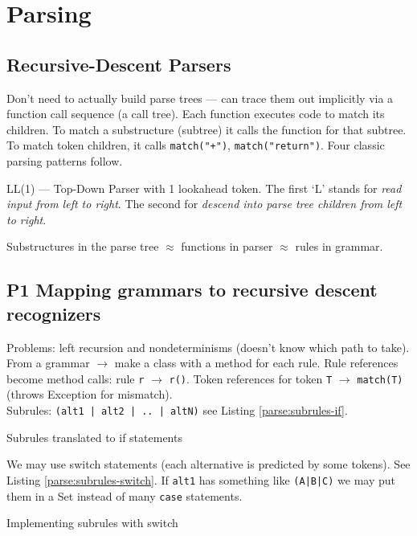 \section{Parsing}


\subsection{Recursive-Descent Parsers}

Don't need to actually build parse trees ---
can trace them out implicitly via a function call sequence (a call tree).
Each function executes code to match its children.
To match a substructure (subtree) it calls the function for that subtree.
To match token children, it calls \verb=match("+")=, \verb=match("return")=.
Four classic parsing patterns follow.

LL(1) --- Top-Down Parser with 1 lookahead token.
The first `L' stands for \emph{read input from left to right}.
The second for \emph{descend into parse tree children from left to right}.

Substructures in the parse tree $\approx$ functions in parser
$\approx$ rules in grammar.


\subsection{P1 Mapping grammars to recursive descent recognizers}

Problems: left recursion and nondeterminisms (doesn't know which path to take).
From a grammar $\rightarrow$ make a class with a method for each rule.
Rule references become method calls: rule \verb=r= $\rightarrow$ \verb=r()=.
Token references for token \verb=T= $\rightarrow$ \verb=match(T)=
(throws Exception for mismatch).\\
Subrules: \verb=(alt1 | alt2 | .. | altN)= see Listing \ref{parse:subrules-if}.

\begin{program}
\caption{Subrules translated to if statements\label{parse:subrules-if}}
\end{program}

We may use switch statements (each alternative is predicted by some tokens).
See Listing \ref{parse:subrules-switch}.
If \verb=alt1= has something like \verb=(A|B|C)=
we may put them in a Set instead of many \verb=case= statements.

\begin{program}
\caption{Implementing subrules with switch\label{parse:subrules-switch}}
\end{program}

